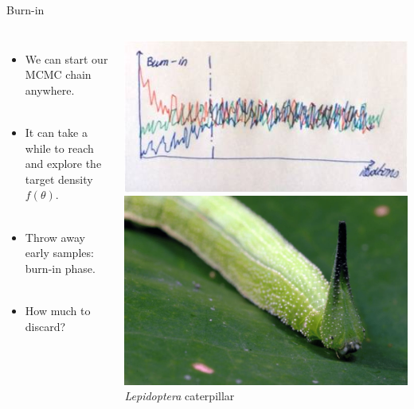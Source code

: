 \documentclass[compress]{beamer}
\begin{document}
\begin{frame}[label=sec-8-8]{Burn-in}
    \begin{columns}[c] 
    \begin{itemize}
        \item We can start our MCMC chain anywhere. \\~\\
        \item It can take a while to reach and explore the target density $f(\theta)$. \\~\\
        \item Throw away early samples: \alert{burn-in} phase. \\~\\
        \item How much to discard? \\~\\
    \end{itemize}
    \includegraphics[width=0.75\linewidth]{Burn}
    \includegraphics[width=0.75\linewidth]{Hairy-caterpillar-Lepidoptera.png}
    \emph{Lepidoptera} caterpillar
\end{columns}
\end{frame} 
\end{document}
